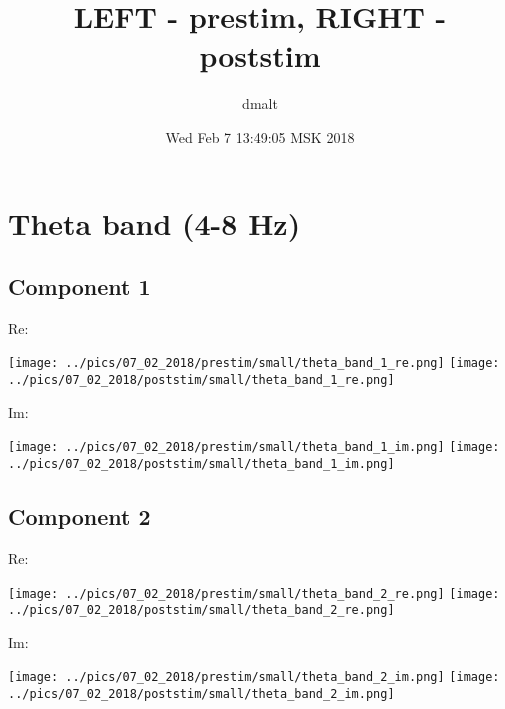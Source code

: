 \documentclass{article}
\title{LEFT - prestim, RIGHT - poststim}
\author{dmalt}
\date{Wed Feb  7 13:49:05 MSK 2018}
\begin{document}
\maketitle 
\newpage
\section{Theta band (4-8 Hz)}
\subsection*{Component 1}
Re:

\hspace{2cm}
\texttt{[image: ../pics/07\_02\_2018/prestim/small/theta\_band\_1\_re.png]}
\hspace{2cm}
\texttt{[image: ../pics/07\_02\_2018/poststim/small/theta\_band\_1\_re.png]}

Im:

\hspace{2cm}
\texttt{[image: ../pics/07\_02\_2018/prestim/small/theta\_band\_1\_im.png]}
\hspace{2cm}
\texttt{[image: ../pics/07\_02\_2018/poststim/small/theta\_band\_1\_im.png]}

\subsection*{Component 2}
Re:

\hspace{2cm}
\texttt{[image: ../pics/07\_02\_2018/prestim/small/theta\_band\_2\_re.png]}
\hspace{2cm}
\texttt{[image: ../pics/07\_02\_2018/poststim/small/theta\_band\_2\_re.png]}


Im:

\hspace{2cm}
\texttt{[image: ../pics/07\_02\_2018/prestim/small/theta\_band\_2\_im.png]}
\hspace{2cm}
\texttt{[image: ../pics/07\_02\_2018/poststim/small/theta\_band\_2\_im.png]}
\end{document}

